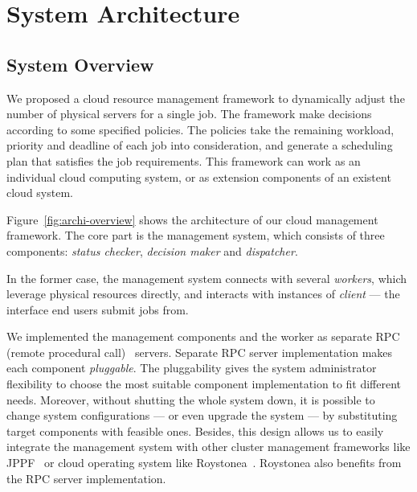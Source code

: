\section{System Architecture}\label{sec:arch}

\subsection{System Overview}

%  

We proposed a cloud resource management framework to dynamically adjust
the number of physical servers for a single job.
The framework make decisions according to some specified policies.
The policies take the remaining workload, priority and deadline of each
job into consideration, and generate a scheduling plan that satisfies
the job requirements.
This framework can work as an individual cloud computing system, or as
extension components of an existent cloud system.

Figure~\ref{fig:archi-overview} shows the architecture of our cloud
management framework.
The core part is the management system, which consists of three
components: \emph{status checker}, \emph{decision maker} and
\emph{dispatcher}.

In the former case, the management system connects with several
\emph{workers}, which leverage physical resources directly, and
interacts with instances of \emph{client} --- the interface end users
submit jobs from.

We implemented the management components and the worker as separate RPC
(remote procedural call)~\cite{cite:RPC} servers.
Separate RPC server implementation makes each component
\emph{pluggable}.
The pluggability gives the system administrator flexibility to choose
the most suitable component implementation to fit different needs.
Moreover, without shutting the whole system down, it is possible to
change system configurations --- or even upgrade the system --- by
substituting target components with feasible ones.
Besides, this design allows us to easily integrate the management system
with other cluster management frameworks like JPPF~\cite{cite:JPPF} or
cloud operating system like Roystonea~\cite{cite:roystonea}.
Roystonea also benefits from the RPC server implementation.

